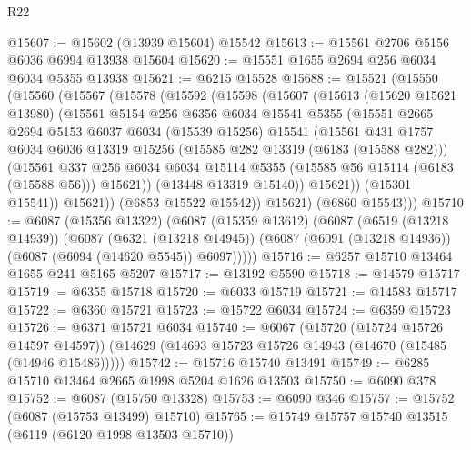\begin{lexlean}{R22}
\begin{coremodule}
@15607 := @15602 (@13939 @15604) @15542
@15613 := @15561 @2706 @5156 @6036 @6994 @13938 @15604
@15620 := @15551 @1655 @2694 @256 @6034 @6034 @5355 @13938
@15621 := @6215 @15528
@15688 := @15521
    (@15550
      (@15560
        (@15567
          (@15578
            (@15592
              (@15598
                (@15607
                  (@15613
                    (@15620 @15621 @13980)
                    (@15561
                      @5154
                      @256
                      @6356
                      @6034
                      @15541
                      @5355
                      (@15551
                        @2665
                        @2694
                        @5153
                        @6037
                        @6034
                        (@15539 @15256)
                        @15541
                        (@15561
                          @431
                          @1757
                          @6034
                          @6036
                          @13319
                          @15256
                          (@15585 @282 @13319 (@6183 (@15588 @282)))
                          (@15561
                            @337
                            @256
                            @6034
                            @6034
                            @15114
                            @5355
                            (@15585 @56 @15114 (@6183 (@15588 @56)))
                            @15621))
                        (@13448 @13319 @15140))
                      @15621))
                  (@15301 @15541))
                @15621))
            (@6853 @15522 @15542))
          @15621)
        (@6860 @15543)))
@15710 := @6087
    (@15356 @13322)
    (@6087
      (@15359 @13612)
      (@6087
        (@6519 (@13218 @14939))
        (@6087
          (@6321 (@13218 @14945))
          (@6087 (@6091 (@13218 @14936)) (@6087 (@6094 (@14620 @5545)) @6097)))))
@15716 := @6257 @15710 @13464 @1655 @241 @5165 @5207
@15717 := @13192 @5590
@15718 := @14579 @15717
@15719 := @6355 @15718
@15720 := @6033 @15719
@15721 := @14583 @15717
@15722 := @6360 @15721
@15723 := @15722 @6034
@15724 := @6359 @15723
@15726 := @6371 @15721 @6034
@15740 := @6067
    (@15720 (@15724 @15726 @14597 @14597))
    (@14629 (@14693 @15723 @15726 @14943 (@14670 (@15485 (@14946 @15486)))))
@15742 := @15716 @15740 @13491
@15749 := @6285 @15710 @13464 @2665 @1998 @5204 @1626 @13503
@15750 := @6090 @378
@15752 := @6087 (@15750 @13328)
@15753 := @6090 @346
@15757 := @15752 (@6087 (@15753 @13499) @15710)
@15765 := @15749 @15757 @15740 @13515 (@6119 (@6120 @1998 @13503 @15710))

\end{coremodule}
\end{lexlean}
